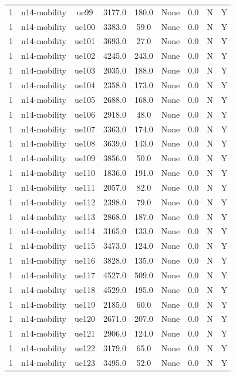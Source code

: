 \begin{table}[ht]
\begin{tabular}{|c|c|c|c|c|c|c|c|c|}
1 & n14-mobility & ue99 & 3177.0 & 180.0 & None & 0.0 & N & Y \\
1 & n14-mobility & ue100 & 3383.0 & 59.0 & None & 0.0 & N & Y \\
1 & n14-mobility & ue101 & 3693.0 & 27.0 & None & 0.0 & N & Y \\
1 & n14-mobility & ue102 & 4245.0 & 243.0 & None & 0.0 & N & Y \\
1 & n14-mobility & ue103 & 2035.0 & 188.0 & None & 0.0 & N & Y \\
1 & n14-mobility & ue104 & 2358.0 & 173.0 & None & 0.0 & N & Y \\
1 & n14-mobility & ue105 & 2688.0 & 168.0 & None & 0.0 & N & Y \\
1 & n14-mobility & ue106 & 2918.0 & 48.0 & None & 0.0 & N & Y \\
1 & n14-mobility & ue107 & 3363.0 & 174.0 & None & 0.0 & N & Y \\
1 & n14-mobility & ue108 & 3639.0 & 143.0 & None & 0.0 & N & Y \\
1 & n14-mobility & ue109 & 3856.0 & 50.0 & None & 0.0 & N & Y \\
1 & n14-mobility & ue110 & 1836.0 & 191.0 & None & 0.0 & N & Y \\
1 & n14-mobility & ue111 & 2057.0 & 82.0 & None & 0.0 & N & Y \\
1 & n14-mobility & ue112 & 2398.0 & 79.0 & None & 0.0 & N & Y \\
1 & n14-mobility & ue113 & 2868.0 & 187.0 & None & 0.0 & N & Y \\
1 & n14-mobility & ue114 & 3165.0 & 133.0 & None & 0.0 & N & Y \\
1 & n14-mobility & ue115 & 3473.0 & 124.0 & None & 0.0 & N & Y \\
1 & n14-mobility & ue116 & 3828.0 & 135.0 & None & 0.0 & N & Y \\
1 & n14-mobility & ue117 & 4527.0 & 509.0 & None & 0.0 & N & Y \\
1 & n14-mobility & ue118 & 4529.0 & 195.0 & None & 0.0 & N & Y \\
1 & n14-mobility & ue119 & 2185.0 & 60.0 & None & 0.0 & N & Y \\
1 & n14-mobility & ue120 & 2671.0 & 207.0 & None & 0.0 & N & Y \\
1 & n14-mobility & ue121 & 2906.0 & 124.0 & None & 0.0 & N & Y \\
1 & n14-mobility & ue122 & 3179.0 & 65.0 & None & 0.0 & N & Y \\
1 & n14-mobility & ue123 & 3495.0 & 52.0 & None & 0.0 & N & Y \\

\end{tabular}
\end{table}
